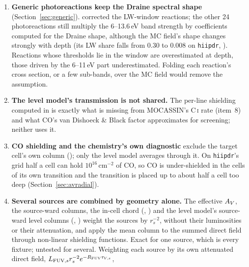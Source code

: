 \begin{enumerate}
  sign and depends steeply on $T$ (it is \Htwo's line cooling where the gas is
  warmer than the levels), but it enters , which MOCASSIN holds
  constant in , and the value used to find $T_e^{(n)}$ was
  computed by the level model at $T_e^{(n-2)}$ (Section~\ref{sec:lags}).
   associates this term, together with the damping, with the two
  derailed iterations at the start of the chemistry. Tabulating it against
  $T$, as the CO cooling is (), would remove the freeze.
\item \textbf{Generic photoreactions keep the Draine spectral shape}
  (Section~\ref{sec:generic}).  corrected the LW-window reactions;
  the other 24 photoreactions still multiply the 6--13.6\,eV band strength by
  coefficients computed for the Draine shape, although the MC field's shape
  changes strongly with depth (its LW share falls from 0.30 to 0.008 on
  \texttt{hiipdr}, ). Reactions whose thresholds lie in the window
  are overestimated at depth, those driven by the 6--11\,eV part underestimated.
  Folding each reaction's cross section, or a few sub-bands, over the MC field
  would remove the assumption.
\item \textbf{The level model's \Htwo{} transmission is not shared.} The
  per-line \Htwo{} shielding computed in  is exactly what is
  missing from MOCASSIN's C\,\textsc{i} rate (item~8) and what CO's
  van Dishoeck \& Black factor approximates for \Htwo{} screening; neither uses
  it.
\item \textbf{CO shielding and the chemistry's own \Htwo{} diagnostic} exclude
  the target cell's own column (); only the level model averages
  through it. On \texttt{hiipdr}'s grid half a cell can hold $10^{16}$\,cm$^{-2}$ of
  CO, so CO is under-shielded in the cells of its own transition and the
  transition is placed up to about half a cell too deep
  (Section~\ref{sec:avradial}).
\item \textbf{Several sources are combined by geometry alone.} The effective
  $A_{V}$, the source-ward columns, the in-cell chord (,
  ) and the level model's source-ward level columns
  (, ) weight the sources by $r_s^{-2}$, without
  their luminosities or their attenuation, and apply the mean column to the
  summed direct field through non-linear shielding functions. Exact for one
  source, which is every fixture; untested for several. Weighting each source
  by its own attenuated direct field, $L_{\mathrm{FUV},s}r_s^{-2}e^{-R_{\mathrm{FUV}}\tau_{V,s}}$,

\end{enumerate}
